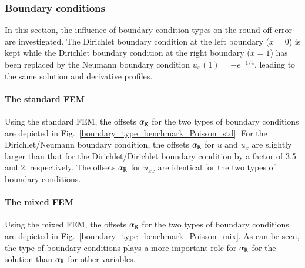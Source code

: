 \documentclass[review,3p]{elsarticle}
\begin{document}
\newpage

\subsubsection{Boundary conditions}	\label{section_BC}

In this section, the influence of boundary condition types on the round-off error are investigated.
The Dirichlet boundary condition at the left boundary ($x=0$) is kept while the Dirichlet boundary condition at the right boundary ($x=1$) has been replaced by the Neumann boundary condition $u_x (1) = -e^{-1/4}$, leading to the same solution and derivative profiles. 


\paragraph{The standard FEM}
Using the standard FEM, the offsets $\alpha_{\rm R}$ for the two types of boundary conditions are depicted in Fig.~\ref{boundary_type_benchmark_Poisson_std}. 
For the Dirichlet/Neumann boundary condition, the offsets $\alpha_{\rm R}$ for $u$ and $u_x$ are slightly larger than that for the Dirichlet/Dirichlet boundary condition by a factor of 3.5 and 2, respectively. The offsets $\alpha_{\rm R}$ for $u_{xx}$ are identical for the two types of boundary conditions.

\paragraph{The mixed FEM}
Using the mixed FEM, the offsets $\alpha_{\rm R}$ for the two types of boundary conditions are depicted in Fig.~\ref{boundary_type_benchmark_Poisson_mix}.
As can be seen, the type of boundary conditions plays a more important role for $\alpha_{\rm R}$ for the solution than $\alpha_{\rm R}$ for other variables.
\end{document}
